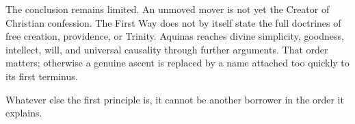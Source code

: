 The conclusion remains limited. An unmoved mover is not yet the Creator of Christian confession. The First Way does not by itself state the full doctrines of free creation, providence, or Trinity. Aquinas reaches divine simplicity, goodness, intellect, will, and universal causality through further arguments. That order matters; otherwise a genuine ascent is replaced by a name attached too quickly to its first terminus.

Whatever else the first principle is, it cannot be another borrower in the order it explains.
